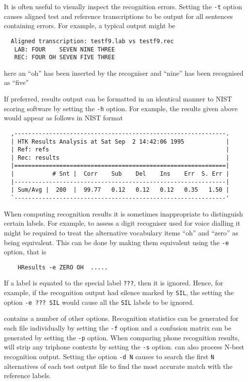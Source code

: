 It is often useful to visually inspect the 
recognition errors.  Setting the
\texttt{-t} option causes aligned test and reference transcriptions to
be output for all sentences containing errors.  For example, a typical
output might be
\begin{verbatim}
  Aligned transcription: testf9.lab vs testf9.rec
   LAB: FOUR    SEVEN NINE THREE
   REC: FOUR OH SEVEN FIVE THREE
\end{verbatim}
here an ``oh'' has been inserted by the recogniser and ``nine''
has been recognised as ``five''

If preferred, results output can be formatted in an identical
manner to NIST scoring software by setting the  {\tt -h} option.
For example, the results given above would appear as follows in
NIST format
\begin{verbatim}
  ,-------------------------------------------------------------.
  | HTK Results Analysis at Sat Sep  2 14:42:06 1995            |
  | Ref: refs                                                   |
  | Rec: results                                                |
  |=============================================================|
  |           # Snt |  Corr    Sub    Del    Ins    Err  S. Err |
  |-------------------------------------------------------------|
  | Sum/Avg |  200  |  99.77   0.12   0.12   0.12   0.35   1.50 |
  `-------------------------------------------------------------'
\end{verbatim}

When computing recognition results it is sometimes
inappropriate to distinguish certain labels.  For example, to assess
a digit recogniser used for voice dialling it might be required to
treat the alternative vocabulary items ``oh'' and ``zero'' as being
equivalent.  This can be done by making them equivalent using the
\texttt{-e} option, that is
\begin{verbatim}
    HResults -e ZERO OH  .....
\end{verbatim}
If a label is equated to the special label \verb+???+, then it 
is ignored.  Hence, for example, if the recognition output had
silence marked by \texttt{SIL}, the setting the option
\verb+-e ??? SIL+ would cause all the \texttt{SIL} labels to be
ignored.

 contains a number of other options.
Recognition statistics can be generated for each file
individually by setting the {\tt -f} option and a 
confusion matrix
can be generated by setting the  {\tt -p} option.
When comparing phone recognition results,  will
strip any triphone contexts by setting the  {\tt -s} option.
 can also process N-best recognition output.
Setting the option \texttt{-d N} causes  to
search the first \texttt{N} alternatives of each test output
file to find the most accurate match with the reference labels.

